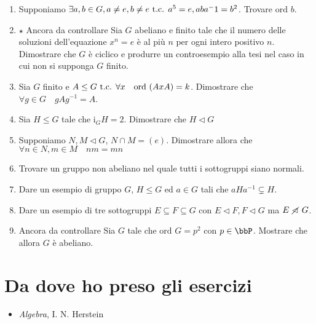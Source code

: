 \documentclass[a4paper,NoNotes,GeneralMath]{stdmdoc}
\newcommand{\Ord}{\text{ord }}
\newcommand{\sgr}{\le}
\newcommand{\nrm}{\lhd}
\newcommand{\ctrl}{{\color{blue} Ancora da controllare }}
\newcommand{\Ind}{\text{i}}
\newcommand{\Star}{ $ \star $ }
\newcommand\nnrm{\mathrel{\ooalign{\hss$\diagup$\hss\cr$\lhd$}}}
\begin{document}
\begin{enumerate}
		\item Supponiamo $\exists a,b \in G, a \neq e, b \neq e \mbox{ t.c. } a^5 = e, aba^-1 = b^2$. Trovare $\Ord b$.
		\item \Star \ctrl Sia $G$ abeliano e finito tale che il numero delle soluzioni dell'equazione $x^n = e$ è al più $n$ per ogni intero positivo $n$. Dimostrare che $G$ è ciclico e produrre un controesempio alla tesi nel caso in cui non si supponga $G$ finito.
		\item Sia $G$ finito e $A \sgr G \tc \forall x \quad \Ord(AxA) = k$. Dimostrare che $\forall g\in G \quad gAg^{-1} = A$.
		\item Sia $H \sgr G$ tale che $\Ind_G H = 2$. Dimostrare che $H \nrm G$
		\item Supponiamo $N, M \nrm G$, $N \cap M = (e)$. Dimostrare allora che $\forall n\in N, m\in M \quad nm = mn$
		\item Trovare un gruppo non abeliano nel quale tutti i sottogruppi siano normali. 
		\item Dare un esempio di gruppo $G$, $H \sgr G$ ed $a \in G$ tali che $aHa^{-1} \subsetneq H$.
		\item Dare un esempio di tre sottogruppi $E \subseteq F \subseteq G$ con $E \nrm F, F \nrm G$ ma $E \nnrm G$.
		\item \ctrl Sia $G$ tale che $\Ord G = p^2$ con $p \in \bbP$. Mostrare che allora $G$ è abeliano.
	\end{enumerate}

	\section*{Da dove ho preso gli esercizi}
	\begin{itemize}
		\item {\it Algebra}, I. N. Herstein
	\end{itemize}
\end{document}
